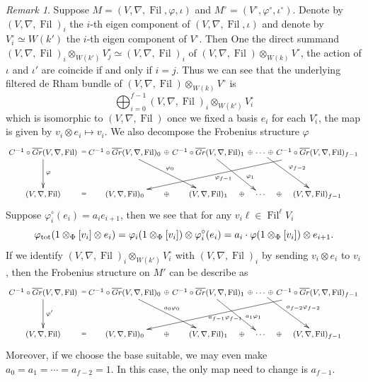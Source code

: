 \documentclass[12pt,twoside]{book}
\theoremstyle{plain}
\theoremstyle{definition}
\theoremstyle{remark}
\newtheorem{remark}[remark]{Remark}
\DeclareMathOperator\Fil{Fil}
\numberwithin{equation}{section}
\begin{document}
\begin{remark} \label{rmk_FFotimesConstFF}
Suppose $M=(V,\nabla,\Fil,\varphi,\iota)$ and $M^\circ=(V^\circ,\varphi^\circ,\iota^\circ)$. Denote by $(V,\nabla,\Fil)_i$ the $i$-th eigen component of $(V,\nabla,\Fil,\iota)$ and denote by $V^\circ_i\simeq W(k')$ the $i$-th eigen component of $V^\circ$. Then
One the direct summand $(V,\nabla,\Fil)_i\otimes_{W(k')} V^\circ_j\simeq (V,\nabla,\Fil)_i$ of $(V,\nabla,\Fil)\otimes_{W(k)} V^\circ$, the action of $\iota$ and $\iota'$ are coincide if and only if $i=j$. Thus we can see that
the underlying filtered de Rham bundle of $(V,\nabla,\Fil)\otimes_{W(k)} V^\circ$ is
\[\bigoplus_{i=0}^{f-1} (V,\nabla,\Fil)_i\otimes_{W(k')} V^\circ_i \]
which is isomorphic to $(V,\nabla,\Fil)$ once we fixed a basis $e_i$ for each $V^\circ_i$, the map is given by $v_i\otimes e_i \mapsto v_i$.
We also decompose the Frobenius structure $\varphi$
\begin{equation*} \footnotesize
\xymatrix@C=2mm@R=1cm{
C^{-1} \circ \overline{Gr} ( V,\nabla,\Fil) \ar[d]^{\varphi} \ar@{}[r]|{=}
& C^{-1} \circ \overline{Gr} ( V,\nabla,\Fil)_0 \ar[dr]^{\varphi_0} \ar@{}[r]|-{\oplus}
& C^{-1} \circ \overline{Gr} ( V,\nabla,\Fil)_1 \ar[dr]^(0.7){\varphi_1} \ar@{}[r]|-{\oplus}
& \cdots \ar[dr]^{\varphi_{f-2}} \ar@{}[r]|-{\oplus}
& C^{-1} \circ \overline{Gr} ( V,\nabla,\Fil)_{f-1} \ar[dlll]^{\varphi_{f-1}}\\
( V,\nabla,\Fil) \ar@{}[r]|{=}
&( V,\nabla,\Fil)_0 \ar@{}[r]|-{\oplus}
&( V,\nabla,\Fil)_1 \ar@{}[r]|-{\oplus}
&\cdots \ar@{}[r]|-{\oplus}
&( V,\nabla,\Fil)_{f-1} \\
}
\end{equation*}
Suppose $\varphi_i^\circ(e_i) = a_ie_{i+1}$, then
we see that for any $v_i\ell\in \Fil^\ell V_i$
\[\varphi_{\rm tot}(1\otimes_{\Phi} [v_i]\otimes e_i) = \varphi_i(1\otimes_{\Phi} [v_i]) \otimes \varphi_i^\circ(e_i) = a_i \cdot \varphi(1\otimes_{\Phi} [v_i]) \otimes e_{i+1}.\]
If we identify $(V,\nabla,\Fil)_i\otimes_{W(k')} V^\circ_i$ with $(V,\nabla,\Fil)_i$ by sending $v_i\otimes e_i$ to $v_i$, then the Frobenius structure on $M'$ can be describe as
\begin{equation*} \footnotesize
\xymatrix@C=2mm@R=1cm{
C^{-1} \circ \overline{Gr} ( V,\nabla,\Fil) \ar[d]^{\varphi'} \ar@{}[r]|{=}
& C^{-1} \circ \overline{Gr} ( V,\nabla,\Fil)_0 \ar[dr]^{a_0\varphi_0} \ar@{}[r]|-{\oplus}
& C^{-1} \circ \overline{Gr} ( V,\nabla,\Fil)_1 \ar[dr]^(0.7){a_1\varphi_1} \ar@{}[r]|-{\oplus}
& \cdots \ar[dr]^{a_{f-2}\varphi_{f-2}} \ar@{}[r]|-{\oplus}
& C^{-1} \circ \overline{Gr} ( V,\nabla,\Fil)_{f-1} \ar[dlll]^{a_{f-1}\varphi_{f-1}}\\
( V,\nabla,\Fil) \ar@{}[r]|{=}
&( V,\nabla,\Fil)_0 \ar@{}[r]|-{\oplus}
&( V,\nabla,\Fil)_1 \ar@{}[r]|-{\oplus}
&\cdots \ar@{}[r]|-{\oplus}
&( V,\nabla,\Fil)_{f-1} \\
}
\end{equation*}
Moreover, if we choose the base suitable, we may even make $a_0=a_1=\cdots=a_{f-2}=1$. In this case, the only map need to change is $a_{f-1}$.
\end{remark}
\end{document}
